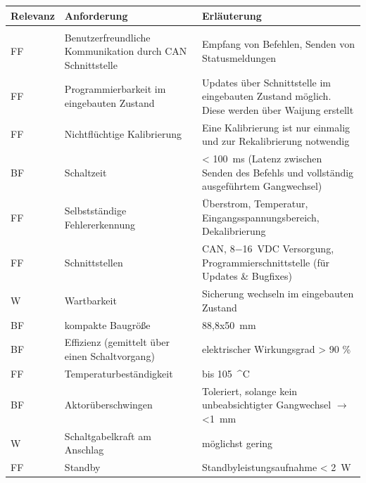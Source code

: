 \begin{table}[h]
	\centering
		\begin{tabular}{l|p{7cm}|p{7cm}}
			\textbf{Relevanz} & \textbf{Anforderung} & \textbf{Erläuterung} \\ \hline
			& &\\
			FF & Benutzerfreundliche Kommunikation durch CAN Schnittstelle & Empfang von Befehlen, Senden von Statusmeldungen \\ \hline
			FF & Programmierbarkeit im eingebauten Zustand & Updates über Schnittstelle im eingebauten Zustand möglich. Diese werden über Waijung erstellt\\ \hline
			FF & Nichtflüchtige Kalibrierung & Eine Kalibrierung ist nur einmalig und zur Rekalibrierung notwendig \\ \hline
			BF & Schaltzeit & < \SI{100}{ms} (Latenz zwischen Senden des Befehls und vollständig ausgeführtem Gangwechsel) \\ \hline
			FF & Selbstständige Fehlererkennung & Überstrom, Temperatur, Eingangsspannungsbereich, Dekalibrierung \\ \hline
			FF & Schnittstellen & CAN, \SI{8-16}{VDC} Versorgung, Programmierschnittstelle (für Updates \& Bugfixes) \\ \hline
			W & Wartbarkeit & Sicherung wechseln im eingebauten Zustand \\ \hline
			BF & kompakte Baugröße & 88,8x\SI{50}{mm}\\ \hline
			BF & Effizienz (gemittelt über einen Schaltvorgang) & elektrischer Wirkungsgrad > 90 \% \\ \hline
			FF & Temperaturbeständigkeit & bis \SI{105}{^\circ C} \\ \hline
			BF & Aktorüberschwingen & Toleriert, solange kein unbeabsichtigter Gangwechsel $\rightarrow$ \SI{<1}{mm} \\ \hline
			W & Schaltgabelkraft am Anschlag & möglichst gering \\ \hline
			FF & Standby & Standbyleistungsaufnahme < \SI{2}{W} \\ \hline
		\end{tabular}
	
	\label{tab:Anforderungsliste}
\end{table}

